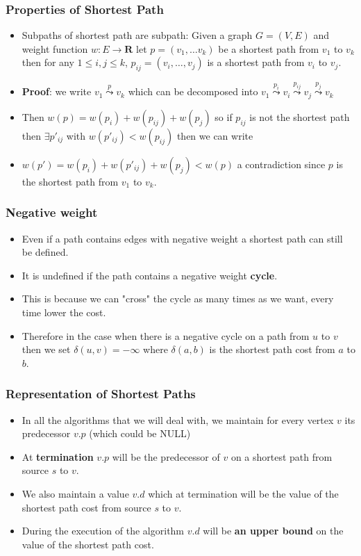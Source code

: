 \documentclass{beamer}
\begin{document}
\begin{frame}
  \frametitle{Properties of Shortest Path}
  \begin{itemize}
  \item Subpaths of shortest path are subpath: Given a graph $G=(V,E)$
    and weight function $w:E\rightarrow \mathbf{R}$ let $p=(v_1,\ldots
    v_k)$ be  a shortest path from $v_1$ to $v_k$ then for any $1\le
    i,j\le k$, $p_{ij}=(v_i,\ldots,v_j)$ is a shortest path from $v_i$
    to $v_j$.
  \item \textbf{Proof}: we write $v_1\stackrel{p}{\leadsto}v_k$ which
    can be decomposed into
    $v_1\stackrel{p_i}{\leadsto}v_i\stackrel{p_{ij}}{\leadsto}v_j\stackrel{p_j}{\leadsto}v_k$
\item Then $w(p)=w(p_i)+w(p_{ij})+w(p_j)$ so if $p_{ij}$ is not the
  shortest path then $\exists p'_{ij}$ with $w(p'_{ij})<w(p_{ij})$ then
  we can write
\item $w(p')=w(p_i)+w(p'_{ij})+w(p_j)<w(p) $ a contradiction since $p$
  is the shortest path from $v_1$ to $v_k$.
  \end{itemize}
\end{frame}

\begin{frame}
  \frametitle{Negative weight}
  \begin{itemize}
  \item Even if a path contains edges with negative weight a shortest
    path can still be defined.
  \item It is undefined if the path contains a negative weight
    \textbf{cycle}.
  \item This is because we can "cross" the cycle as many times as we
    want, every time lower the cost.
 \item Therefore in the case when there is a negative cycle on a path
   from $u$ to $v$ then we set $\delta(u,v)=-\infty$ where
   $\delta(a,b)$ is the shortest path cost from $a$ to $b$.
  \end{itemize}
\end{frame}


\begin{frame}
  \frametitle{Representation of Shortest Paths}
  \begin{itemize}
  \item In all the algorithms that we will deal with, we maintain for
    every vertex $v$ its predecessor $v.p$ (which could be NULL)
  \item At \textbf{termination} $v.p$ will be the predecessor of $v$
    on a shortest path from source $s$ to $v$.
  \item We  also maintain a value $v.d$ which at termination will be
    the value of the shortest path cost from source $s$ to $v$.
  \item During the execution of the algorithm $v.d$ will be \textbf{an
      upper bound} on the value of the shortest path cost.
  \end{itemize}
\end{frame}
\end{document}
